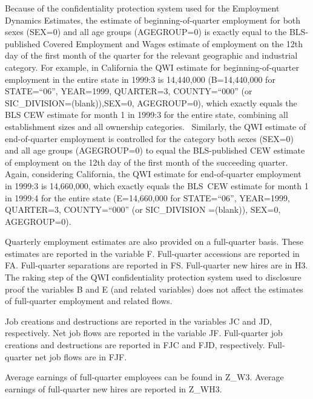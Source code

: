 Because of the confidentiality protection system used for the Employment
Dynamics Estimates, the estimate of beginning-of-quarter employment for both
sexes (\textsf{SEX}=0) and all age groups (\textsf{AGEGROUP}=0) is exactly
equal to the BLS-published Covered Employment and Wages estimate of
employment on the 12th day of the first month of the quarter for the
relevant geographic and industrial category. For example, in California the
QWI estimate for beginning-of-quarter employment in the entire state in
1999:3 is 14,440,000 (\textsf{B}=14,440,000 for \textsf{STATE}=``06'', 
\textsf{YEAR}=1999, \textsf{QUARTER}=3, \textsf{COUNTY}=``000'' (or \textsf{%
SIC\_DIVISION}=(blank)),\textsf{SEX}=0, \textsf{AGEGROUP}=0), which exactly
equals the BLS CEW estimate for month 1 in 1999:3 for the entire state,
combining all establishment sizes and all ownership categories. \ Similarly,
the QWI estimate of end-of-quarter employment is controlled for the category
both sexes (\textsf{SEX}=0) and all age groups (\textsf{AGEGROUP}=0) to
equal the BLS-published CEW estimate of employment on the 12th day of the
first month of the succeeding quarter. Again, considering California, the
QWI estimate for end-of-quarter employment in 1999:3 is 14,660,000, which
exactly equals the BLS\ CEW estimate for month 1 in 1999:4 for the entire
state (\textsf{E}=14,660,000 for \textsf{STATE}=``06'', \textsf{YEAR}=1999, 
\textsf{QUARTER}=3, \textsf{COUNTY}=``000'' (or \textsf{SIC\_DIVISION}%
=(blank)), \textsf{SEX}=0, \textsf{AGEGROUP}=0). 

Quarterly employment estimates are also provided on a full-quarter basis.
These estimates are reported in the variable \textsf{F}. Full-quarter
accessions are reported in \textsf{FA}. Full-quarter separations are
reported in \textsf{FS}. Full-quarter new hires are in \textsf{H3. }The
raking step of the QWI confidentiality protection system used to disclosure
proof the variables \textsf{B} and \textsf{E} (and related variables) does
not affect the estimates of full-quarter employment and related flows.

Job creations and destructions are reported in the variables \textsf{JC} and 
\textsf{JD}, respectively. Net job flows are reported in the variable 
\textsf{JF}. Full-quarter job creations and destructions are reported in 
\textsf{FJC} and \textsf{FJD}, respectively. Full-quarter net job flows are
in \textsf{FJF}.

Average earnings of full-quarter employees can be found in \textsf{Z\_W3}.
Average earnings of full-quarter new hires are reported in \textsf{Z\_WH3}.

